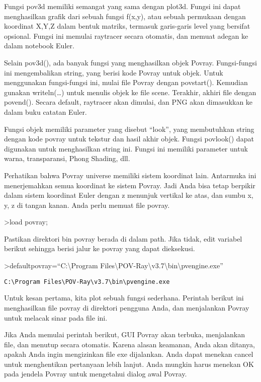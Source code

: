 \documentclass[
]{book}
\begin{document}
Fungsi pov3d memiliki semangat yang sama dengan plot3d. Fungsi ini dapat menghasilkan grafik dari sebuah fungsi f(x,y), atau sebuah permukaan dengan koordinat X,Y,Z dalam bentuk matriks, termasuk garis-garis level yang bersifat opsional. Fungsi ini memulai raytracer secara otomatis, dan memuat adegan ke dalam notebook Euler.

Selain pov3d(), ada banyak fungsi yang menghasilkan objek Povray. Fungsi-fungsi ini mengembalikan string, yang berisi kode Povray untuk objek. Untuk menggunakan fungsi-fungsi ini, mulai file Povray dengan povstart(). Kemudian gunakan writeln(\ldots) untuk menulis objek ke file scene. Terakhir, akhiri file dengan povend(). Secara default, raytracer akan dimulai, dan PNG akan dimasukkan ke dalam buku catatan Euler.

Fungsi objek memiliki parameter yang disebut ``look'', yang membutuhkan string dengan kode povray untuk tekstur dan hasil akhir objek. Fungsi povlook() dapat digunakan untuk menghasilkan string ini. Fungsi ini memiliki parameter untuk warna, transparansi, Phong Shading, dll.

Perhatikan bahwa Povray universe memiliki sistem koordinat lain. Antarmuka ini menerjemahkan semua koordinat ke sistem Povray. Jadi Anda bisa tetap berpikir dalam sistem koordinat Euler dengan z menunjuk vertikal ke atas, dan sumbu x, y, z di tangan kanan. Anda perlu memuat file povray.

\textgreater load povray;

Pastikan direktori bin povray berada di dalam path. Jika tidak, edit variabel berikut sehingga berisi jalur ke povray yang dapat dieksekusi.

\textgreater defaultpovray=``C:\textbackslash Program Files\textbackslash POV-Ray\textbackslash v3.7\textbackslash bin\textbackslash pvengine.exe''

\begin{verbatim}
C:\Program Files\POV-Ray\v3.7\bin\pvengine.exe
\end{verbatim}

Untuk kesan pertama, kita plot sebuah fungsi sederhana. Perintah berikut ini menghasilkan file povray di direktori pengguna Anda, dan menjalankan Povray untuk melacak sinar pada file ini.

Jika Anda memulai perintah berikut, GUI Povray akan terbuka, menjalankan file, dan menutup secara otomatis. Karena alasan keamanan, Anda akan ditanya, apakah Anda ingin mengizinkan file exe dijalankan. Anda dapat menekan cancel untuk menghentikan pertanyaan lebih lanjut. Anda mungkin harus menekan OK pada jendela Povray untuk mengetahui dialog awal Povray.
\end{document}
